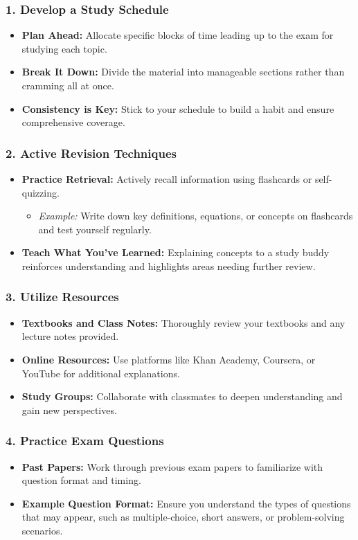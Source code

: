 \documentclass{beamer}
\begin{document}
\begin{frame}[fragile]
    \frametitle{1. Develop a Study Schedule}
    \begin{itemize}
        \item \textbf{Plan Ahead:} Allocate specific blocks of time leading up to the exam for studying each topic.
        \item \textbf{Break It Down:} Divide the material into manageable sections rather than cramming all at once.
        \item \textbf{Consistency is Key:} Stick to your schedule to build a habit and ensure comprehensive coverage.
    \end{itemize}
\end{frame}

\begin{frame}[fragile]
    \frametitle{2. Active Revision Techniques}
    \begin{itemize}
        \item \textbf{Practice Retrieval:} Actively recall information using flashcards or self-quizzing.
        \begin{itemize}
            \item \textit{Example:} Write down key definitions, equations, or concepts on flashcards and test yourself regularly.
        \end{itemize}
        \item \textbf{Teach What You've Learned:} Explaining concepts to a study buddy reinforces understanding and highlights areas needing further review.
    \end{itemize}
\end{frame}

\begin{frame}[fragile]
    \frametitle{3. Utilize Resources}
    \begin{itemize}
        \item \textbf{Textbooks and Class Notes:} Thoroughly review your textbooks and any lecture notes provided.
        \item \textbf{Online Resources:} Use platforms like Khan Academy, Coursera, or YouTube for additional explanations.
        \item \textbf{Study Groups:} Collaborate with classmates to deepen understanding and gain new perspectives.
    \end{itemize}
\end{frame}

\begin{frame}[fragile]
    \frametitle{4. Practice Exam Questions}
    \begin{itemize}
        \item \textbf{Past Papers:} Work through previous exam papers to familiarize with question format and timing.
        \item \textbf{Example Question Format:} Ensure you understand the types of questions that may appear, such as multiple-choice, short answers, or problem-solving scenarios.
    \end{itemize}
\end{frame}
\end{document}
